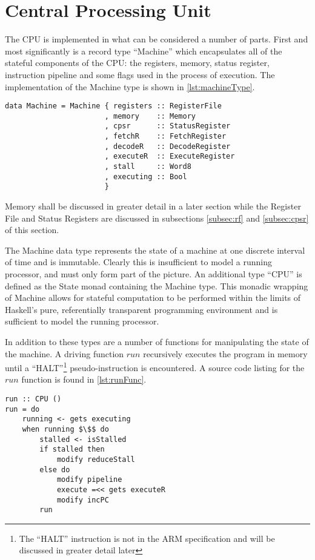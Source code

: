 \section{Central Processing Unit}
\label{sec:cpu}

The CPU is implemented in what can be considered a number of parts. First and most significantly is a record type ``Machine'' which encapsulates all of the stateful components of the CPU: the registers, memory, status register, instruction pipeline and some flags used in the process of execution. The implementation of the Machine type is shown in \autoref{lst:machineType}.

\begin{lstlisting}[numbers=none,float,caption={The AddressingModeMulti data type},label={lst:machineType}]
data Machine = Machine { registers :: RegisterFile
                       , memory    :: Memory
                       , cpsr      :: StatusRegister
                       , fetchR    :: FetchRegister
                       , decodeR   :: DecodeRegister
                       , executeR  :: ExecuteRegister
                       , stall     :: Word8
                       , executing :: Bool
                       }
\end{lstlisting}

Memory shall be discussed in greater detail in a later section while the Register File and Status Registers are discussed in subsections \ref{subsec:rf} and \ref{subsec:cpsr} of this section.

The Machine data type represents the state of a machine at one discrete interval of time and is immutable. Clearly this is insufficient to model a running processor, and must only form part of the picture. An additional type ``CPU'' is defined as the State monad containing the Machine type. This monadic wrapping of Machine allows for stateful computation to be performed within the limits of Haskell's pure, referentially transparent programming environment and is sufficient to model the running processor.

In addition to these types are a number of functions for manipulating the state of the machine. A driving function $run$ recursively executes the program in memory until a ``HALT''\footnote{The ``HALT'' instruction is not in the ARM specification and will be discussed in greater detail later} pseudo-instruction is encountered. A source code listing for the $run$ function is found in \autoref{lst:runFunc}.

\begin{lstlisting}[mathescape,numbers=none,caption={The $run$ function},label={lst:runFunc}]
run :: CPU ()
run = do
    running <- gets executing
    when running $\$$ do
        stalled <- isStalled
        if stalled then
            modify reduceStall
        else do
            modify pipeline
            execute =<< gets executeR
            modify incPC
        run
\end{lstlisting}

